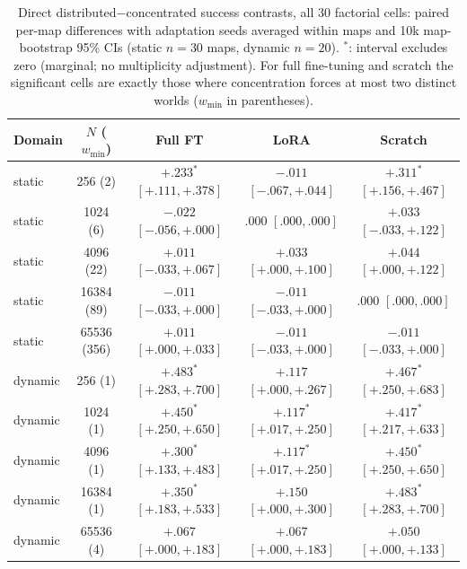 \documentclass[letterpaper]{article} %
\begin{document}
\begin{table}[t]
\centering
\small
\setlength{\tabcolsep}{3.4pt}
\begin{tabular}{@{}lc ccc@{}}
\toprule
Domain & $N$ ($w_{\min}$) & Full FT & LoRA & Scratch \\
\midrule
static & 256 (2) & $+.233^{*}$ $[+.111,+.378]$ & $-.011$ $[-.067,+.044]$ & $+.311^{*}$ $[+.156,+.467]$ \\
static & 1024 (6) & $-.022$ $[-.056,+.000]$ & $.000$ $[.000,.000]$ & $+.033$ $[-.033,+.122]$ \\
static & 4096 (22) & $+.011$ $[-.033,+.067]$ & $+.033$ $[+.000,+.100]$ & $+.044$ $[+.000,+.122]$ \\
static & 16384 (89) & $-.011$ $[-.033,+.000]$ & $-.011$ $[-.033,+.000]$ & $.000$ $[.000,.000]$ \\
static & 65536 (356) & $+.011$ $[+.000,+.033]$ & $-.011$ $[-.033,+.000]$ & $-.011$ $[-.033,+.000]$ \\
dynamic & 256 (1) & $+.483^{*}$ $[+.283,+.700]$ & $+.117$ $[+.000,+.267]$ & $+.467^{*}$ $[+.250,+.683]$ \\
dynamic & 1024 (1) & $+.450^{*}$ $[+.250,+.650]$ & $+.117^{*}$ $[+.017,+.250]$ & $+.417^{*}$ $[+.217,+.633]$ \\
dynamic & 4096 (1) & $+.300^{*}$ $[+.133,+.483]$ & $+.117^{*}$ $[+.017,+.250]$ & $+.450^{*}$ $[+.250,+.650]$ \\
dynamic & 16384 (1) & $+.350^{*}$ $[+.183,+.533]$ & $+.150$ $[+.000,+.300]$ & $+.483^{*}$ $[+.283,+.700]$ \\
dynamic & 65536 (4) & $+.067$ $[+.000,+.183]$ & $+.067$ $[+.000,+.183]$ & $+.050$ $[+.000,+.133]$ \\
\bottomrule
\end{tabular}
\caption{Direct distributed$-$concentrated success contrasts, all 30 factorial cells: paired per-map differences with adaptation seeds averaged within maps and 10k map-bootstrap 95\% CIs (static $n{=}30$ maps, dynamic $n{=}20$). $^{*}$: interval excludes zero (marginal; no multiplicity adjustment). For full fine-tuning and scratch the significant cells are exactly those where concentration forces at most two distinct worlds ($w_{\min}$ in parentheses).}
\label{tab:c14cov}
\end{table}
\end{document}
